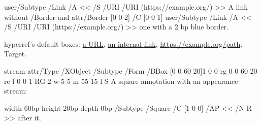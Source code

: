 \documentclass{article}
\begin{document}
\noindent\pdfstartlink user{/Subtype /Link /A << /S /URI /URI (https://example.org/) >>}%
A link without /Border\pdfendlink{} and
\pdfstartlink attr{/Border [0 0 2] /C [0 0 1]} user{/Subtype /Link /A << /S /URI /URI (https://example.org/) >>}%
one with a 2 bp blue border\pdfendlink.
\newpage

\noindent hyperref's default boxes: \href{https://example.org/}{a URL}, \hyperlink{t}{an internal link},
\url{https://example.org/path}.
\hypertarget{t}{Target.}
\newpage

\noindent\immediate\pdfobj stream attr{/Type /XObject /Subtype /Form /BBox [0 0 60 20]}{1 0 0 rg 0 0 60 20 re f 0 0 1 RG 2 w 5 5 m 55 15 l S}%
\edef\AP{\the\pdflastobj}%
A square annotation with an appearance stream:
\pdfannot width 60bp height 20bp depth 0bp {/Subtype /Square /C [1 0 0] /AP << /N \AP{} R >>}\hspace{60bp} after it.
\end{document}
